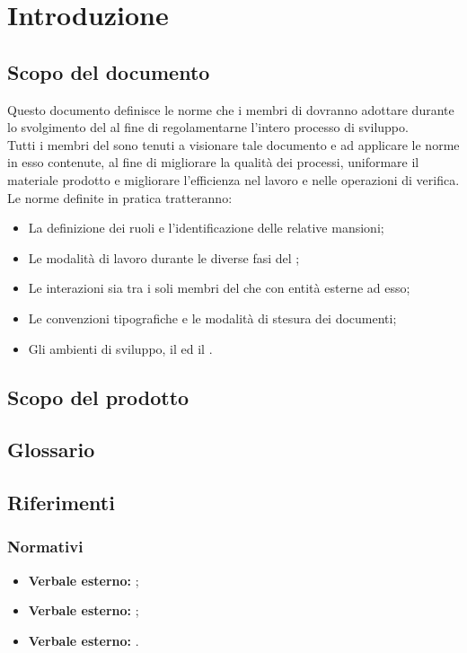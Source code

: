 \section{Introduzione}
\subsection{Scopo del documento}
Questo documento definisce le norme che i membri di \gruppo dovranno adottare durante lo svolgimento del  \progetto al fine di regolamentarne l'intero processo di sviluppo.\\
Tutti i membri del  sono tenuti a visionare tale documento e ad applicare le norme in esso contenute, al fine di migliorare la qualità dei processi, uniformare il materiale prodotto e migliorare l'efficienza nel lavoro e nelle  operazioni di verifica.\\
Le norme definite in pratica tratteranno:
\begin{itemize}
\item La definizione dei ruoli e l’identificazione delle relative mansioni;
\item Le modalità di lavoro durante le diverse fasi del ;
\item Le interazioni sia tra i soli membri del  che con entità esterne ad esso;
\item Le convenzioni tipografiche e le modalità di stesura dei documenti;
\item Gli ambienti di sviluppo, il  ed il .
\end{itemize}
\subsection{Scopo del prodotto}
\scopoProdotto
\subsection{Glossario} %
\descrizioneGlossario
\subsection{Riferimenti}
\subsubsection{Normativi}
\begin{itemize}
\item \textbf{Verbale esterno:} \eI;
\item \textbf{Verbale esterno:} \eV;
\item \textbf{Verbale esterno:} \eVI.
\end{itemize}
